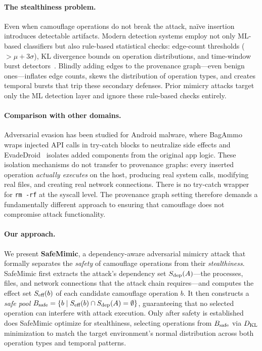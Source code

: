 \paragraph{The stealthiness problem.}
Even when camouflage operations do not break the attack, na\"ive insertion introduces detectable artifacts.
Modern detection systems employ not only ML-based classifiers but also rule-based statistical checks: edge-count thresholds ($>\mu + 3\sigma$), KL divergence bounds on operation distributions, and time-window burst detectors~\cite{unicorn,shadewatcher}.
Blindly adding edges to the provenance graph---even benign ones---inflates edge counts, skews the distribution of operation types, and creates temporal bursts that trip these secondary defenses.
Prior mimicry attacks target only the ML detection layer and ignore these rule-based checks entirely.

\paragraph{Comparison with other domains.}
Adversarial evasion has been studied for Android malware, where BagAmmo~\cite{bagammo} wraps injected API calls in try-catch blocks to neutralize side effects and EvadeDroid~\cite{evadedroid} isolates added components from the original app logic.
These isolation mechanisms do not transfer to provenance graphs: every inserted operation \emph{actually executes} on the host, producing real system calls, modifying real files, and creating real network connections.
There is no try-catch wrapper for \texttt{rm -rf} at the syscall level.
The provenance graph setting therefore demands a fundamentally different approach to ensuring that camouflage does not compromise attack functionality.

\paragraph{Our approach.}
We present \textbf{SafeMimic}, a dependency-aware adversarial mimicry attack that formally separates the \emph{safety} of camouflage operations from their \emph{stealthiness}.
SafeMimic first extracts the attack's dependency set $S_{\text{dep}}(A)$---the processes, files, and network connections that the attack chain requires---and computes the effect set $S_{\text{eff}}(b)$ of each candidate camouflage operation $b$.
It then constructs a \emph{safe pool} $B_{\text{safe}} = \{b \mid S_{\text{eff}}(b) \cap S_{\text{dep}}(A) = \emptyset\}$, guaranteeing that no selected operation can interfere with attack execution.
Only after safety is established does SafeMimic optimize for stealthiness, selecting operations from $B_{\text{safe}}$ via $D_{\text{KL}}$ minimization to match the target environment's normal distribution across both operation types and temporal patterns.

